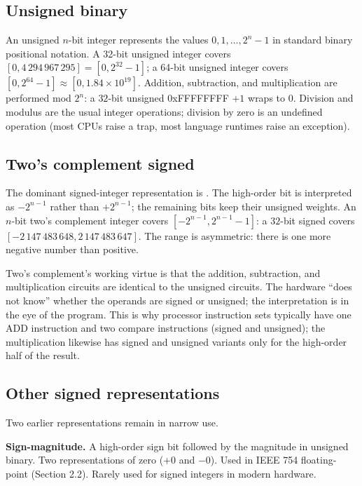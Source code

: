 \subsection{Unsigned binary}

An unsigned $n$-bit integer represents the values $0, 1, \ldots, 2^n - 1$ in standard binary positional notation. A 32-bit unsigned integer covers $[0, 4\,294\,967\,295] = [0, 2^{32} - 1]$; a 64-bit unsigned integer covers $[0, 2^{64} - 1] \approx [0, 1.84 \times 10^{19}]$. Addition, subtraction, and multiplication are performed mod $2^n$: a $32$-bit unsigned $0$xFFFFFFFF $+ 1$ wraps to $0$. Division and modulus are the usual integer operations; division by zero is an undefined operation (most CPUs raise a trap, most language runtimes raise an exception).

\subsection{Two's complement signed}

The dominant signed-integer representation is . The high-order bit is interpreted as $-2^{n-1}$ rather than $+2^{n-1}$; the remaining bits keep their unsigned weights. An $n$-bit two's complement integer covers $[-2^{n-1}, 2^{n-1} - 1]$: a $32$-bit signed covers $[-2\,147\,483\,648, 2\,147\,483\,647]$. The range is asymmetric: there is one more negative number than positive.

Two's complement's working virtue is that the addition, subtraction, and multiplication circuits are identical to the unsigned circuits. The hardware ``does not know'' whether the operands are signed or unsigned; the interpretation is in the eye of the program. This is why processor instruction sets typically have one ADD instruction and two compare instructions (signed and unsigned); the multiplication likewise has signed and unsigned variants only for the high-order half of the result.

\subsection{Other signed representations}

Two earlier representations remain in narrow use.

\textbf{Sign-magnitude.} A high-order sign bit followed by the magnitude in unsigned binary. Two representations of zero ($+0$ and $-0$). Used in IEEE 754 floating-point (Section 2.2). Rarely used for signed integers in modern hardware.

